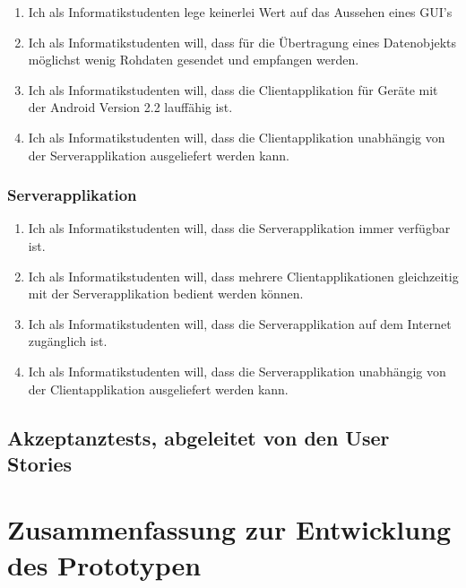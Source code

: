 \documentclass[listof=totocnumbered, bibliography=totocnumbered]{scrreprt}
\begin{document}
  \begin{enumerate}
    \setcounter{enumi}{\value{userStoriesZaehler}}
    \item Ich als Informatikstudenten lege keinerlei Wert auf das Aussehen
    eines \ac{GUI}'s
    \item Ich als Informatikstudenten will, dass für die Übertragung eines
    Datenobjekts möglichst wenig Rohdaten gesendet und empfangen werden.
    \item Ich als Informatikstudenten will, dass die Clientapplikation für
    Geräte mit der Android Version 2.2 lauffähig ist.
    \item Ich als Informatikstudenten will, dass die Clientapplikation
    unabhängig von der Serverapplikation ausgeliefert werden kann.
    \setcounter{userStoriesZaehler}{\value{enumi}}
  \end{enumerate}
  
  \subsubsection{Serverapplikation}
  
  \begin{enumerate}
    \setcounter{enumi}{\value{userStoriesZaehler}}
    \item Ich als Informatikstudenten will, dass die Serverapplikation immer
    verfügbar ist.
    \item Ich als Informatikstudenten will, dass mehrere Clientapplikationen
    gleichzeitig mit der Serverapplikation bedient werden können.
    \item Ich als Informatikstudenten will, dass die Serverapplikation
    auf dem Internet zugänglich ist.
    \item Ich als Informatikstudenten will, dass die Serverapplikation
    unabhängig von der Clientapplikation ausgeliefert werden kann.
    \setcounter{userStoriesZaehler}{\value{enumi}}
  \end{enumerate}
  
  \subsection{Akzeptanztests, abgeleitet von den User Stories}
  
  \newpage
  
  \section{Zusammenfassung zur Entwicklung des Prototypen}
  
\end{document}
